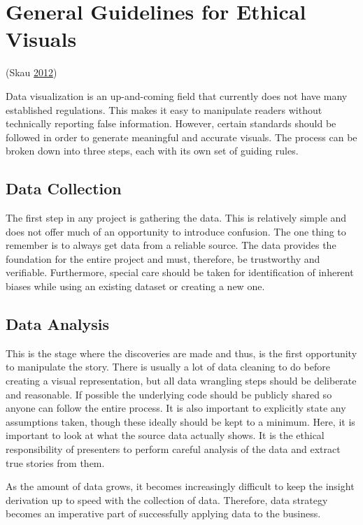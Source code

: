 \documentclass[]{book}
\theoremstyle{definition}
\theoremstyle{definition}
\theoremstyle{definition}
\theoremstyle{remark}
\begin{document}
\section{General Guidelines for Ethical
Visuals}\label{general-guidelines-for-ethical-visuals}

(Skau \protect\hyperlink{ref-ethics_code}{2012})

Data visualization is an up-and-coming field that currently does not
have many established regulations. This makes it easy to manipulate
readers without technically reporting false information. However,
certain standards should be followed in order to generate meaningful and
accurate visuals. The process can be broken down into three steps, each
with its own set of guiding rules.

\subsection{Data Collection}\label{data-collection}

The first step in any project is gathering the data. This is relatively
simple and does not offer much of an opportunity to introduce confusion.
The one thing to remember is to always get data from a reliable source.
The data provides the foundation for the entire project and must,
therefore, be trustworthy and verifiable. Furthermore, special care
should be taken for identification of inherent biases while using an
existing dataset or creating a new one.

\subsection{Data Analysis}\label{data-analysis}

This is the stage where the discoveries are made and thus, is the first
opportunity to manipulate the story. There is usually a lot of data
cleaning to do before creating a visual representation, but all data
wrangling steps should be deliberate and reasonable. If possible the
underlying code should be publicly shared so anyone can follow the
entire process. It is also important to explicitly state any assumptions
taken, though these ideally should be kept to a minimum. Here, it is
important to look at what the source data actually shows. It is the
ethical responsibility of presenters to perform careful analysis of the
data and extract true stories from them.

As the amount of data grows, it becomes increasingly difficult to keep
the insight derivation up to speed with the collection of data.
Therefore, data strategy becomes an imperative part of successfully
applying data to the business.
\end{document}
